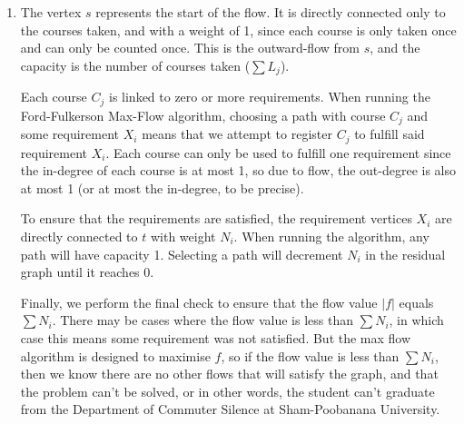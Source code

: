 \documentclass[12pt,a4paper]{article}
\begin{document}
\begin{enumerate}[label=(\Alph*)]
		\item
		The vertex $s$ represents the start of the flow. It is directly connected only to the courses taken, and with a weight of 1, since each course is only taken once and can only be counted once. This is the outward-flow from $s$, and the capacity is the number of courses taken ($\sum L_j$).

		Each course $C_j$ is linked to zero or more requirements. When running the Ford-Fulkerson Max-Flow algorithm, choosing a path with course $C_j$ and some requirement $X_i$ means that we attempt to register $C_j$ to fulfill said requirement $X_i$. Each course can only be used to fulfill one requirement since the in-degree of each course is at most 1, so due to flow, the out-degree is also at most 1 (or at most the in-degree, to be precise).

		To ensure that the requirements are satisfied, the requirement vertices $X_i$ are directly connected to $t$ with weight $N_i$. When running the algorithm, any path will have capacity 1. Selecting a path will decrement $N_i$ in the residual graph until it reaches 0.

		Finally, we perform the final check to ensure that the flow value $|f|$ equals $\sum N_i$. There may be cases where the flow value is less than $\sum N_i$, in which case this means some requirement was not satisfied. But the max flow algorithm is designed to maximise $f$, so if the flow value is less than $\sum N_i$, then we know there are no other flows that will satisfy the graph, and that the problem can't be solved, or in other words, the student can't graduate from the Department of Commuter Silence at Sham-Poobanana University.
		
	\end{enumerate}

\newpage
\end{document}
